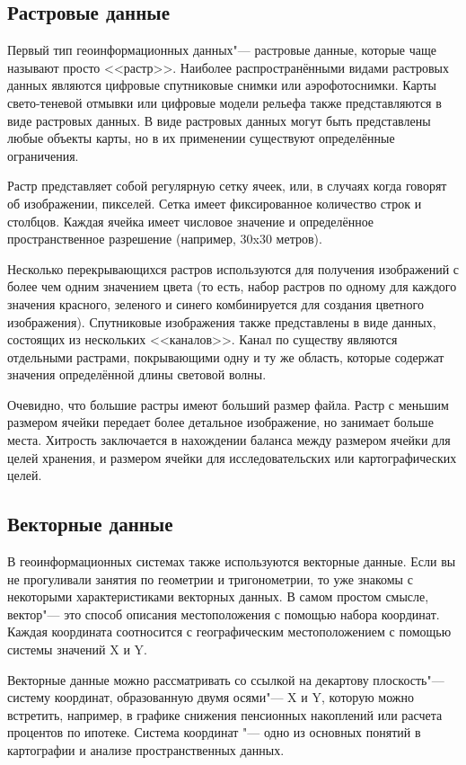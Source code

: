 \subsection{Растровые данные}\label{label_rasterdata}

Первый тип геоинформационных данных"--- растровые данные, которые чаще называют
просто <<растр>>. Наиболее распространёнными видами растровых данных являются
цифровые спутниковые снимки или аэрофотоснимки. Карты свето-теневой
отмывки или цифровые модели рельефа также представляются в виде растровых
данных. В виде растровых данных могут быть представлены любые объекты карты,
но в их применении существуют определённые ограничения.

Растр представляет собой регулярную сетку ячеек, или, в случаях когда
говорят об изображении, пикселей. Сетка имеет фиксированное количество
строк и столбцов. Каждая ячейка имеет числовое значение и определённое
пространственное разрешение (например, 30x30 метров).

Несколько перекрывающихся растров используются для получения изображений
с более чем одним значением цвета (то есть, набор растров по одному для каждого
значения красного, зеленого и синего комбинируется для создания
цветного изображения). Спутниковые изображения также представлены в виде данных,
состоящих из нескольких <<каналов>>. Канал по существу являются отдельными растрами,
покрывающими одну и ту же область, которые содержат значения определённой
длины световой волны.

Очевидно, что большие растры имеют больший размер файла. Растр с меньшим
размером ячейки передает более детальное изображение, но занимает больше места.
Хитрость заключается в нахождении баланса между размером ячейки для целей
хранения, и размером ячейки для исследовательских или картографических целей.

\subsection{Векторные данные}\label{label_vectordata}

В геоинформационных системах также используются векторные данные. Если
вы не прогуливали занятия по геометрии и тригонометрии, то уже знакомы
с некоторыми характеристиками векторных данных. В самом простом смысле,
вектор"--- это способ описания местоположения с помощью набора координат.
Каждая координата соотносится с географическим местоположением с помощью
системы значений X и Y.

Векторные данные можно рассматривать со ссылкой на декартову плоскость"---
систему координат, образованную двумя осями"--- X и Y, которую можно встретить,
например, в графике снижения пенсионных накоплений или расчета процентов по ипотеке.
Система координат "--- одно из основных понятий в картографии и анализе пространственных
данных.

